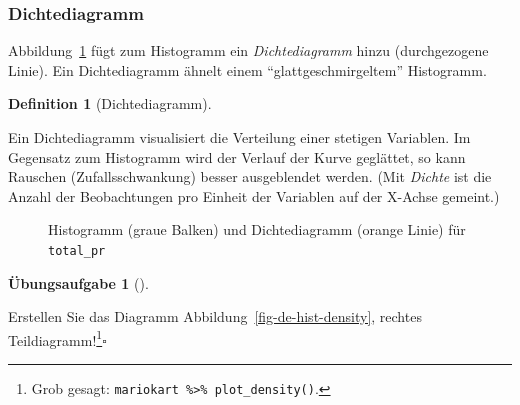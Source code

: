 \documentclass[
  letterpaper,
]{scrbook}
\theoremstyle{definition}
\newtheorem{exercise}{Übungsaufgabe}[chapter]
\theoremstyle{definition}
\theoremstyle{definition}
\newtheorem{definition}{Definition}[chapter]
\theoremstyle{remark}
\begin{document}
\subsubsection{Dichtediagramm}\label{dichtediagramm}

Abbildung~\ref{fig-balken-total-pr-hist-dens} fügt zum Histogramm ein
\emph{Dichtediagramm} hinzu (durchgezogene Linie). Ein Dichtediagramm
ähnelt einem \enquote{glattgeschmirgeltem} Histogramm.

\begin{definition}[Dichtediagramm]\protect\hypertarget{def-dichtediagramm}{}\label{def-dichtediagramm}

Ein Dichtediagramm visualisiert die Verteilung einer stetigen Variablen.
Im Gegensatz zum Histogramm wird der Verlauf der Kurve geglättet, so
kann Rauschen (Zufallsschwankung) besser ausgeblendet werden. (Mit
\emph{Dichte} ist die Anzahl der Beobachtungen pro Einheit der Variablen
auf der X-Achse gemeint.)

\end{definition}

\begin{figure}


\caption{\label{fig-balken-total-pr-hist-dens}Histogramm (graue Balken)
und Dichtediagramm (orange Linie) für \texttt{total\_pr}}

\end{figure}%

\begin{exercise}[]\protect\hypertarget{exr-plot-density}{}\label{exr-plot-density}

Erstellen Sie das Diagramm Abbildung~\ref{fig-de-hist-density}, rechtes
Teildiagramm!\footnote{Grob gesagt:
  \texttt{mariokart\ \%\textgreater{}\%\ plot\_density()}.}\(\square\)

\end{exercise}
\end{document}
